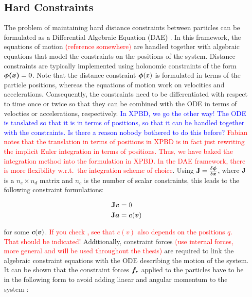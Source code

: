 \subsection{Hard Constraints}\label{ss:hard-constraints}
The problem of maintaining hard distance constraints between particles can be formulated as a Differential Algebraic Equation (DAE)
\cite{ascher1995, baraff1996}. In this framework, the equations of motion \textcolor{red}{(reference somewhere)} are handled together 
with algebraic equations that model the constraints on the positions of the system. Distance constraints are typically implemented using 
holonomic constraints 
of the form $\bm{\phi(x)} = 0$. Note that the distance constraint $\bm{\phi}(x)$ is formulated in terms of the particle positions, 
whereas the equations of motion work on velocities and accelerations. Consequently, the constraints need to be differentiated with 
respect to time once or twice so that they can be 
combined with the ODE in terms of velocties or accelerations, respectively. \textcolor{blue}{In XPBD, we go the other way! The ODE
is tanslated so that it is in terms of positions, so that it can be handled together with the constraints. Is there a reason nobody 
bothered to do this before?} \textcolor{red}{Fabian notes that the translation in terms of positions in XPBD is in fact just rewriting
the implicit Euler integration in terms of positions. Thus, we have baked the integration method into the formulation in XPBD. In the DAE
framework, there is more flexibility w.r.t.\ the integration scheme of choice}. Using $\mathbf{J} = \frac{\delta \bm{\phi}}{\delta \bm{x}}$, 
where $\mathbf{J}$ is a $n_c \times n_d$ matrix and $n_c$ is the number of scalar constraints, this leads to the following constraint 
formulations:

\begin{align*}
    \mathbf{J}\bm{v} &= 0 \\
    \mathbf{J}\bm{a} &= \bm{c}(\bm{v})
\end{align*}

for some $\bm{c}(\bm{v})$. \textcolor{red}{If you check \cite{ascher1995}, see that $c(v)$ also depends on the positions $q$. That should 
be indicated!} 
Additionally, constraint forces \textcolor{red}{(use internal forces, more general and will be used throughout the thesis)} are 
required to link the algebraic constraint equations with the ODE describing the motion of 
the system. It can be shown that the constraint forces $\bm{f_c}$ applied to the particles have to be in the following form to 
avoid adding linear and angular momentum to the system \cite{baraff1996}:

